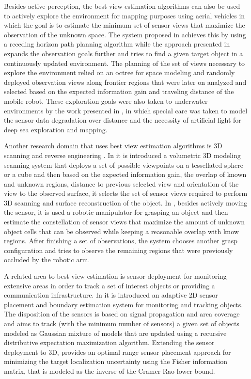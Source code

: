 Besides active perception, the best view estimation algorithms can also be used to actively explore the environment for mapping purposes using aerial vehicles in which the goal is to estimate the minimum set of sensor views that maximize the observation of the unknown space. The system proposed in \cite{Bircher2016} achieves this by using a receding horizon path planning algorithm while the approach presented in \cite{Gedicke2016} expands the observation goals further and tries to find a given target object in a continuously updated environment. The planning of the set of views necessary to explore the environment relied on an octree for space modeling and randomly deployed observation views along frontier regions that were later on analyzed and selected based on the expected information gain and traveling distance of the mobile robot. These exploration goals were also taken to underwater environments by the work presented in \cite{Sheinin2016}, in which special care was taken to model the sensor data degradation over distance and the necessity of artificial light for deep sea exploration and mapping.

Another research domain that uses best view estimation algorithms is 3D scanning and reverse engineering \cite{Jubert2021}. In \cite{Irving2014} it is introduced a volumetric 3D modeling scanning system that deploys a set of possible viewpoints on a tessellated sphere or a cube and then based on the expected information gain, the overlap of known and unknown regions, distance to previous selected view and orientation of the view to the observed surface, it selects the set of sensor views required to perform 3D scanning and surface reconstruction of the object.
In \cite{Krainin2011}, besides actively moving the sensor, it is used a robotic manipulator for grasping an object and then estimate the constellation of sensor views that maximize the amount of unknown object cells that can be observed while keeping a reasonable overlap with know regions. After finishing a set of observations, the system chooses another grasp configuration and tries to observe the remaining regions that were previously occluded by the robotic arm.

A related area to best view estimation is sensor deployment for monitoring extensive areas in order to track a set of interest objects or providing a communication infrastructure. In \cite{Guo2008} it is introduced an adaptive 2D sensor placement and boundary estimation system for monitoring and tracking objects. The disposition of the sensors is based on signal propagation and area coverage and aims to track (with the minimum number of sensors) a given set of objects modeled as Gaussian mixture of models that are updated using a recursive distributive expectation maximization algorithm. Extending the sensor deployment to 3D, \cite{Zhao2013} provides an optimal range sensor placement approach for minimizing the target localization uncertainty using the Fisher information matrix, that is modeled as the inverse of the Cramer Rao lower bound.%

